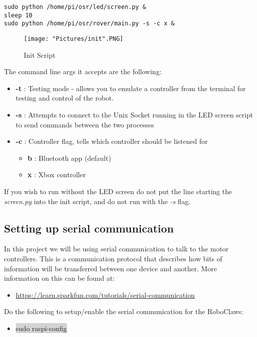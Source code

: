 \documentclass[12pt]{article}
\begin{document}
\begin{verbatim}
sudo python /home/pi/osr/led/screen.py &
sleep 10
sudo python /home/pi/osr/rover/main.py -s -c x &
\end{verbatim}

\begin{figure}[H]
 	\centering
	\texttt{[image: "Pictures/init".PNG]}
 	\caption{Init Script}
	\label{init}
\end{figure}

The command line args it accepts are the following:

\begin{itemize}
	\item[] \textbf{-t} : Testing mode - allows you to emulate a controller from the terminal for testing and control of the robot. 
	\item[] \textbf{-s} : Attempts to connect to the Unix Socket running in the LED screen script to send commands between the two processes
	\item[] \textbf{-c} : Controller flag, tells which controller should be listened for
	\begin{itemize}
		\item [] \textbf{b} : Bluetooth app (default)
		\item [] \textbf{x} : Xbox controller
	\end{itemize} 	

\end{itemize}

If you wish to run without the LED screen do not put the line starting the \textit{screen.py} into the init script, and do not run with the \textit{-s} flag.

\subsection{Setting up serial communication}	

In this project we will be using serial communication to talk to the motor controllers. This is a communication protocol that describes how bits of information will be transferred between one device and another. More information on this can be found at:
\begin{itemize}
	\item \href{https://learn.sparkfun.com/tutorials/serial-communication}{https://learn.sparkfun.com/tutorials/serial-communication}
\end{itemize}

\noindent Do the following to setup/enable the serial communication for the RoboClaws:
\begin{itemize}
	\item[] \colorbox{lightgray}{sudo raspi-config}
\end{itemize}
\end{document}
